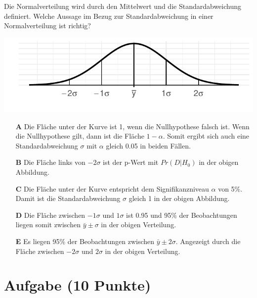 \documentclass[a4paper, 9pt]{scrartcl}\usepackage[]{graphicx}\usepackage[]{xcolor}
\makeatletter
\def\maxwidth{ %
  \ifdim\Gin@nat@width>\linewidth
    \linewidth
  \else
    \Gin@nat@width
  \fi
}
\makeatother
\begin{document}
Die Normalverteilung wird durch den Mittelwert und die Standardabweichung definiert. Welche Aussage im Bezug zur Standardabweichung in einer Normalverteilung ist richtig?



{\centering \includegraphics[width=\maxwidth]{img/mc-distribution-02-a-1} 

}







\begin{enumerate}
\item [\textbf{A} \msquare] Die Fläche unter der Kurve ist 1, wenn die Nullhypothese falsch ist. Wenn die Nullhypothese gilt, dann ist die Fläche $1-\alpha$. Somit ergibt sich auch eine Standardabweichung $\sigma$ mit $\alpha$ gleich 0.05 in beiden Fällen.
\item [\textbf{B} \msquare] Die Fläche links von $-2\sigma$ ist der p-Wert mit $Pr(D|H_0)$ in der obigen Abbildung.
\item [\textbf{C} \msquare] Die Fläche unter der Kurve entspricht dem Signifikanzniveau $\alpha$ von 5\%. Damit ist die Standardabweichung $\sigma$ gleich 1 in der obigen Abbildung.
\item [\textbf{D} \msquare] Die Fläche zwischen $-1\sigma$ und $1\sigma$ ist 0.95 und 95\% der Beobachtungen liegen somit zwischen $\bar{y}\pm\sigma$ in der obigen Verteilung.
\item [\textbf{E} \msquare] Es liegen 95\% der Beobachtungen zwischen $\bar{y}\pm 2 \sigma$. Angezeigt durch die Fläche zwischen $-2\sigma$ und $2\sigma$ in der obigen Verteilung.
\end{enumerate}

\clearpage

\section{Aufgabe \hfill (10 Punkte)}
\end{document}
